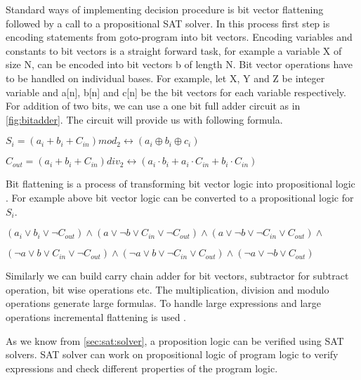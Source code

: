 Standard ways of implementing decision procedure is bit vector flattening followed by a call to a propositional SAT solver. In this process first step is encoding  statements from goto-program into bit vectors. Encoding variables and constants to bit vectors is a straight forward task, for example a variable X of size N, can be encoded into bit vectors b of length N. Bit vector operations have to be handled on individual bases. For example, let X, Y and Z be integer variable and a[n], b[n] and c[n] be the bit vectors for each variable respectively. For addition of two bits, we can use a one bit full adder circuit as in \autoref{fig:bitadder}. The circuit will provide us with following formula.

$S_i = (a_i + b_i + C_{in}) mod_2   \longleftrightarrow  (a_i \oplus b_i \oplus c_i)$


$C_{out} = (a_i + b_i + C_{in}) div_2   \longleftrightarrow  (a_i \cdot b_i + a_i \cdot C_{in} + b_i \cdot C_{in})$

Bit flattening is a process of transforming bit vector logic into propositional logic \cite{3540741046}. For example above bit vector logic can be converted to a propositional logic for $S_i$.

$ (a_i \vee b_i \vee \neg C_{out}) \wedge (a \vee \neg b \vee C_{in} \vee \neg C_{out}) \wedge (a \vee \neg b \vee \neg C_{in} \vee C_{out}) \wedge $

$(\neg a \vee b \vee C_{in} \vee \neg C_{out}) \wedge (\neg a \vee b \vee \neg C_{in} \vee  C_{out}) \wedge (\neg a \vee \neg b \vee C_{out})$


Similarly we can build carry chain adder for bit vectors, subtractor for subtract operation, bit wise operations etc. The multiplication, division and modulo operations generate large formulas. To handle large expressions and large operations incremental flattening is used \cite{3540741046}.

As we know from \autoref{sec:sat:solver}, a proposition logic can be verified using SAT solvers. SAT solver can work on propositional logic of program logic to verify expressions and check different properties of the program logic.



